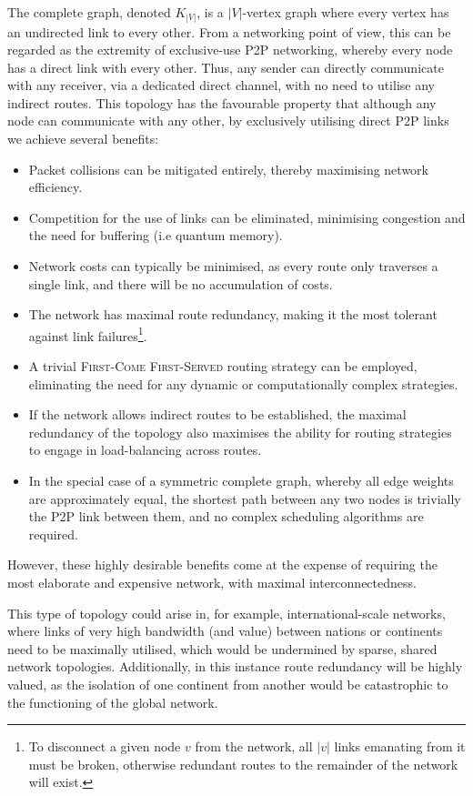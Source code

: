 The complete graph, denoted $K_{|V|}$, is a $|V|$-vertex graph where every vertex has an undirected link to every other. From a networking point of view, this can be regarded as the extremity of exclusive-use P2P networking, whereby every node has a direct link with every other. Thus, any sender can directly communicate with any receiver, via a dedicated direct channel, with no need to utilise any indirect routes. This topology has the favourable property that although any node can communicate with any other, by exclusively utilising direct P2P links we achieve several benefits:
\begin{itemize}
\item Packet collisions can be mitigated entirely, thereby maximising network efficiency.
\item Competition for the use of links can be eliminated, minimising congestion and the need for buffering (i.e quantum memory).
\item Network costs can typically be minimised, as every route only traverses a single link, and there will be no accumulation of costs.
\item The network has maximal route redundancy, making it the most tolerant against link failures\footnote{To disconnect a given node $v$ from the network, all $|v|$ links emanating from it must be broken, otherwise redundant routes to the remainder of the network will exist.}.
\item A trivial \textsc{First-Come First-Served} routing strategy can be employed, eliminating the need for any dynamic or computationally complex strategies.
\item If the network allows indirect routes to be established, the maximal redundancy of the topology also maximises the ability for routing strategies to engage in load-balancing across routes.
\item In the special case of a symmetric complete graph, whereby all edge weights are approximately equal, the shortest path between any two nodes is trivially the P2P link between them, and no complex scheduling algorithms are required.
\end{itemize}
However, these highly desirable benefits come at the expense of requiring the most elaborate and expensive network, with maximal interconnectedness.

This type of topology could arise in, for example, international-scale networks, where links of very high bandwidth (and value) between nations or continents need to be maximally utilised, which would be undermined by sparse, shared network topologies. Additionally, in this instance route redundancy will be highly valued, as the isolation of one continent from another would be catastrophic to the functioning of the global network.

